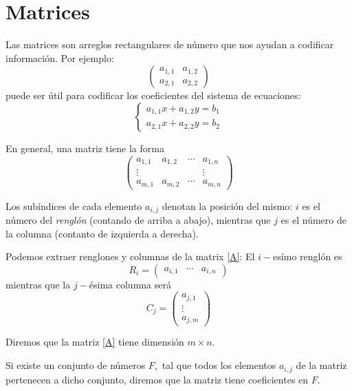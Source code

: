 \section{Matrices}


Las matrices son arreglos rectangulares de número que nos ayudan a codificar información. Por ejemplo:
$$
\begin{pmatrix}
	a_{1,1} & a_{1,2} \\
	a_{2,1} & a_{2,2}
\end{pmatrix}
$$
puede ser útil para codificar los coeficientes del sistema de ecuaciones:
$$
\begin{cases}
	a_{1,1}x+a_{1,2}y=b_{1}\\
	a_{2,1}x+a_{2,2}y=b_{2}
\end{cases}
$$



En general, una matriz tiene la forma 
\begin{equation}
	\label{A}
	\tag{A}
	\begin{pmatrix}
		a_{1,1} & a_{1,2} & \cdots & a_{1,n} \\
		\vdots & & & \vdots\\
		a_{m,1} & a_{m,2} & \cdots & a_{m,n} 
	\end{pmatrix}
\end{equation} 

Los subíndices de cada elemento $a_{i,j}$ denotan la posición del mismo: $i$ es el número del \emph{renglón} (contando de arriba a abajo), mientras que $j$ es el número de la columna (contanto de izquierda a derecha).



Podemos extraer renglones y columnas de la matrix \eqref{A}: El $i-$esímo renglón es
$$
R_{i}=
\begin{pmatrix}
	a_{i,1} & \cdots & a_{i,n}
\end{pmatrix}
$$ 
mientras que la $j-$\'esima columna será
$$
C_{j}=
\begin{pmatrix}
	a_{j,1} \\
	\vdots \\
	a_{j,m}
\end{pmatrix}
$$



Diremos que la matriz \eqref{A} tiene dimensión $m\times n.$ 

Si existe un conjunto de números $F,$ tal que todos los elementos $a_{i,j}$ de la matriz pertenecen a dicho conjunto, diremos que la matriz tiene coeficientes en $F.$ 



